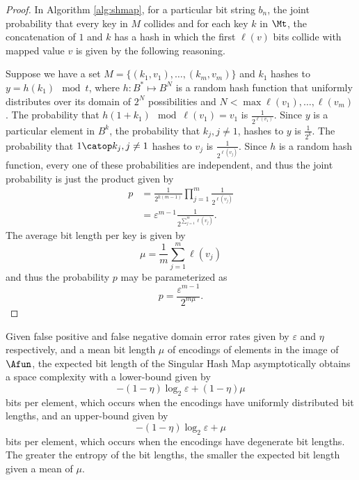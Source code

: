 \documentclass[
  letterpaper,
  DIV=11,
  numbers=noendperiod]{scrartcl}
\theoremstyle{remark}
\begin{document}
\begin{proof}
In Algorithm \ref{alg:shmap}, for a particular bit string \(b_n\), the
joint probability that every key in \(M\) collides and for each key
\(k\) in \(\Mt\), the concatenation of \(1\) and \(k\) has a hash in
which the first \(\ell(v)\) bits collide with mapped value \(v\) is
given by the following reasoning.

Suppose we have a set \(M = \{(k_1,v_1),\ldots,(k_m,v_m)\}\) and \(k_1\)
hashes to \(y = h(k_1) \mod t\), where \(h : B^* \mapsto B^N\) is a
random hash function that uniformly distributes over its domain of
\(2^N\) possibilities and \(N < \max{\ell(v_1),\ldots,\ell(v_m)}\). The
probability that \(h(1 + k_1) \mod \ell(v_1) = v_1\) is
\(\frac{1}{2^{\ell(v_1)}}\). Since \(y\) is a particular element in
\(B^k\), the probability that \(k_j, j \neq 1\), hashes to \(y\) is
\(\frac{1}{2^k}\). The probability that \(1 \catop k_j, j \neq 1\)
hashes to \(v_j\) is \(\frac{1}{2^{\ell(v_j)}}\). Since \(h\) is a
random hash function, every one of these probabilities are independent,
and thus the joint probability is just the product given by
\begin{align}
    p &= \frac{1}{2^{k(m-1)}} \prod_{j=1}^{m} \frac{1}{2^{\ell(v_j)}}\\
      &= \varepsilon^{m-1} \frac{1}{2^{\sum_{j=1}^{m} \ell(v_j)}}.
\end{align} The average bit length per key is given by \begin{equation}
    \mu = \frac{1}{m} \sum_{j=1}^{m} \ell(v_j)
\end{equation} and thus the probability \(p\) may be parameterized as
\begin{equation}
    p = \frac{\varepsilon^{m-1}}{2^{m \mu}}.
\end{equation}
\end{proof}

Given false positive and false negative domain error rates given by
\(\varepsilon\) and \(\eta\) respectively, and a mean bit length \(\mu\)
of encodings of elements in the image of \(\Afun\), the expected bit
length of the Singular Hash Map asymptotically obtains a space
complexity with a lower-bound given by \begin{equation}
    -(1 - \eta) \log_2 \varepsilon + (1 - \eta) \mu
\end{equation} bits per element, which occurs when the encodings have
uniformly distributed bit lengths, and an upper-bound given by
\begin{equation}
    -(1 - \eta) \log_2 \varepsilon + \mu
\end{equation} bits per element, which occurs when the encodings have
degenerate bit lengths. The greater the entropy of the bit lengths, the
smaller the expected bit length given a mean of \(\mu\).
\end{document}
